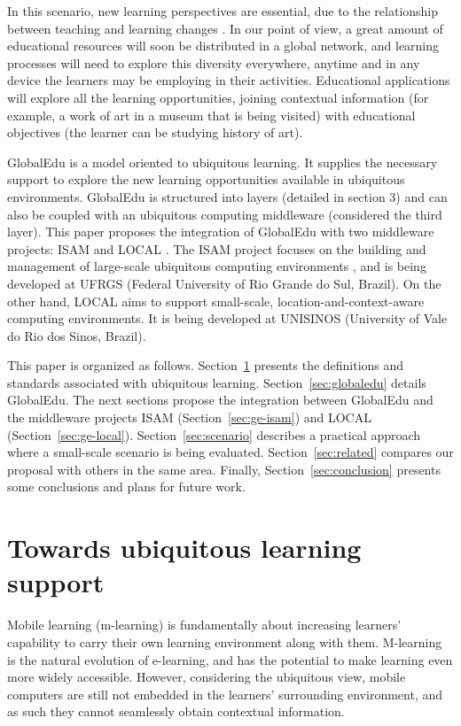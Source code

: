 \documentclass[5p,authoryear]{elsarticle}
\begin{document}
In this scenario, new learning perspectives are essential, due to the
relationship between teaching and learning changes \citep{rogers05}. In our
point of view, a great amount of educational resources will soon be distributed
in a global network, and learning processes will need to explore this diversity
everywhere, anytime and in any device the learners may be employing in their
activities.  Educational applications will explore all the learning
opportunities, joining contextual information (for example, a work of art in a
museum that is being visited) with educational objectives (the learner can be
studying history of art). 

GlobalEdu is a model oriented to ubiquitous learning. It supplies the necessary
support to explore the new learning opportunities available in ubiquitous
environments. GlobalEdu is structured into layers (detailed in section 3) and
can also be coupled with an ubiquitous computing middleware (considered the
third layer). This paper proposes the integration of GlobalEdu with two
middleware projects: ISAM \citep{yamin02,augustin04} and LOCAL
\citep{barbosa07,barbosa08}. The ISAM project focuses on the building and
management of large-scale ubiquitous computing environments \citep{augustin05},
and is being developed at UFRGS (Federal University of Rio Grande do Sul,
Brazil). On the other hand, LOCAL aims to support small-scale,
location-and-context-aware computing environments. It is being developed at
UNISINOS (University of Vale do Rio dos Sinos, Brazil).

This paper is organized as follows. Section~\ref{sec:ubisupport} presents the
definitions and standards associated with ubiquitous learning.
Section~\ref{sec:globaledu} details GlobalEdu.  The next sections propose the
integration between GlobalEdu and the middleware projects ISAM
(Section~\ref{sec:ge-isam}) and LOCAL (Section~\ref{sec:ge-local}).
Section~\ref{sec:scenario} describes a practical approach where a small-scale
scenario is being evaluated. Section~\ref{sec:related} compares our proposal
with others in the same area. Finally, Section~\ref{sec:conclusion} presents
some conclusions and plans for future work.

%
%
\section{Towards ubiquitous learning support} \label{sec:ubisupport}

Mobile learning (m-learning) \citep{tatar03} is fundamentally about increasing
learners' capability to carry their own learning environment along with them.
M-learning is the natural evolution of e-learning, and has the potential to
make learning even more widely accessible. However, considering the ubiquitous
view, mobile computers are still not embedded in the learners' surrounding
environment, and as such they cannot seamlessly obtain contextual information. 
\end{document}
